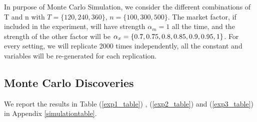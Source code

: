 \documentclass[12pt]{article}
\begin{document}

In purpose of Monte Carlo Simulation, we consider the different combinations of T and n with $T = \{120, 240, 360\}$, $n =\{100, 300, 500\} $.
The market factor, if included in the experiment, will have strength $\alpha_m = 1$ all the time, and the strength of the other factor will be $\alpha_{x} = \{0.7, 0.75, 0.8,0.85, \\
0.9,0.95, 1\}$. For every setting, we will replicate 2000 times independently, all the constant and variables will be re-generated for each replication.



\subsection{Monte Carlo Discoveries}
We report the results in Table (\ref{exp1_table}) , (\ref{exp2_table}) and (\ref{exp3_table}) in Appendix \ref{simulationtable}.
\end{document}
